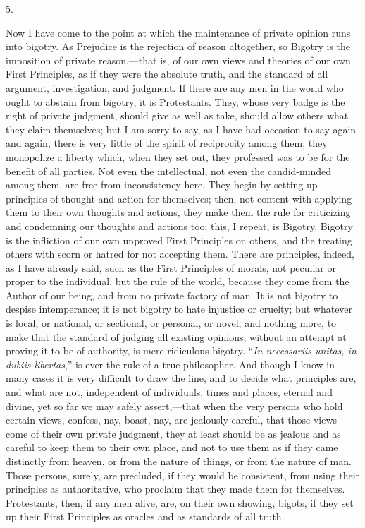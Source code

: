 5.

Now I have come to the point at which the maintenance
of private opinion runs into bigotry. As Prejudice is the
rejection of reason altogether, so Bigotry is the
imposition of private reason,—that is, of our own
views and theories of our own First Principles, as if
they were the absolute truth, and the standard of all
argument, investigation, and judgment. If there are any
men in the world who ought to abstain from bigotry, it is
Protestants. They, whose very badge is the right of
private judgment, should give as well as take, should
allow others what they claim themselves; but I am sorry
to say, as I have had occasion to say again and again,
there is very little of the spirit of reciprocity among
them; they monopolize a liberty which, when they set out,
they professed was to be for the benefit of all parties.
Not even the intellectual, not even the candid-minded
among them, are free from inconsistency here. They begin
by setting up principles of thought and action for
themselves; then, not content with applying them to their
own thoughts and actions, they make them the rule for
criticizing and condemning our thoughts and actions too;
this, I repeat, is Bigotry. Bigotry is the infliction of
our own unproved First Principles on others, and the
treating others with scorn or hatred for not accepting
them. There are principles, indeed, as I have already
said, such as the First Principles of morals, not
peculiar or proper to the individual, but the rule of the
world, because they come from the Author of our being,
and from no private factory of man. It is not bigotry to
despise intemperance; it is not bigotry to hate injustice
or cruelty; but whatever is local, or national, or
sectional, or personal, or novel, and nothing more, to
make that the standard of judging all existing opinions,
without an attempt at proving it to be of authority, is
mere ridiculous bigotry. ``\emph{In necessariis unitas,
in dubiis libertas},'' is ever the rule of a true
philosopher. And though I know in many cases it is very
difficult to draw the line, and to decide what principles
are, and what are not, independent of individuals, times
and places, eternal and divine, yet so far we may safely
assert,—that when the very persons who hold certain
views, confess, nay, boast, nay, are jealously careful,
that those views come of their own private judgment, they
at least should be as jealous and as careful to keep them
to their own place, and not to use them as if they came
distinctly from heaven, or from the nature of things, or
from the nature of man. Those persons, surely, are
precluded, if they would be consistent, from using their
principles as authoritative, who proclaim that they made
them for themselves. Protestants, then, if any men alive,
are, on their own showing, bigots, if they set up their
First Principles as oracles and as standards of all
truth.

